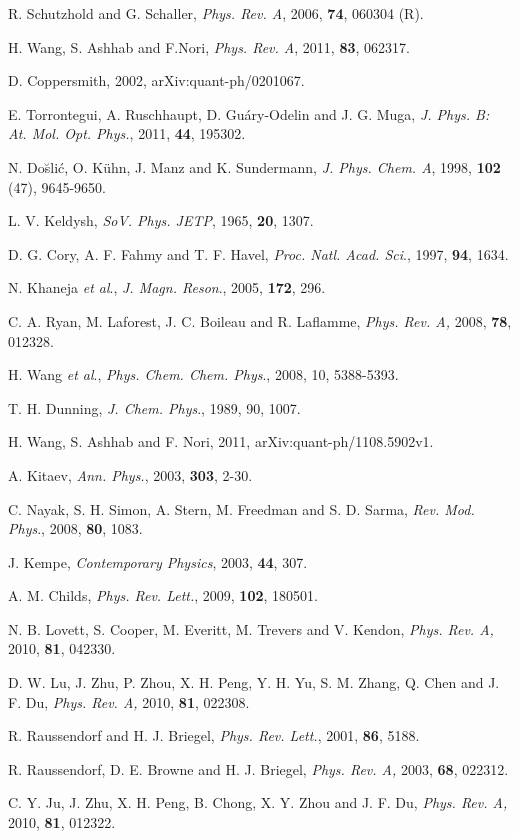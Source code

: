 \documentclass[8.5pt,twoside,twocolumn]{article}
\begin{document}
\begin{thebibliography}{99}
 R. Schutzhold and G. Schaller, \emph{Phys. Rev. A}, 2006, \textbf{74}, 060304
(R).

 H. Wang, S. Ashhab and F.Nori, \emph{Phys. Rev. A}, 2011, \textbf{83}, 062317.


D. Coppersmith, 2002, arXiv:quant-ph/0201067.

E. Torrontegui, A. Ruschhaupt, D. Gu\'{a}ry-Odelin and J. G. Muga, \emph{J. Phys. B: At. Mol. Opt. Phys.}, 2011, \textbf{44}, 195302.

N. Do\u{s}li\'{c}, O. K\"{u}hn, J. Manz and K. Sundermann, \emph{J. Phys. Chem. A}, 1998, \textbf{102} (47), 9645-9650.

L. V. Keldysh, \emph{SoV. Phys. JETP}, 1965, \textbf{20}, 1307.


D. G. Cory, A. F. Fahmy and T. F. Havel, \emph{Proc. Natl. Acad. Sci}., 1997, \textbf{94}, 1634.

N. Khaneja \emph{et al}., \emph{J. Magn. Reson}., 2005, \textbf{172}, 296.


C. A. Ryan, M. Laforest, J. C. Boileau and R. Laflamme, \emph{Phys. Rev. A,} 2008, \textbf{78}, 012328.

H. Wang \emph{et al}., \emph{Phys. Chem. Chem. Phys}., 2008, 10, 5388-5393.

 T. H. Dunning, \emph{J. Chem. Phys}., 1989, 90, 1007.

 H. Wang, S. Ashhab and F. Nori, 2011, arXiv:quant-ph/1108.5902v1.

A. Kitaev, \emph{Ann. Phys.}, 2003, \textbf{303}, 2-30.

C. Nayak, S. H. Simon, A. Stern, M. Freedman and S. D. Sarma, \emph{Rev. Mod. Phys}., 2008, \textbf{80}, 1083.

J. Kempe, \emph{Contemporary Physics}, 2003, \textbf{44}, 307.

 A. M. Childs, \emph{Phys. Rev. Lett.}, 2009, \textbf{102}, 180501.

N. B. Lovett, S. Cooper, M. Everitt, M. Trevers and V. Kendon, \emph{Phys. Rev. A,} 2010, \textbf{81}, 042330.

D. W. Lu, J. Zhu, P. Zhou, X. H. Peng, Y. H. Yu, S. M. Zhang, Q. Chen and J. F. Du, \emph{Phys. Rev. A,} 2010, \textbf{81}, 022308.

R. Raussendorf and H. J. Briegel, \emph{Phys. Rev. Lett.}, 2001, \textbf{86}, 5188.


R. Raussendorf, D. E. Browne and H. J. Briegel, \emph{Phys. Rev. A,} 2003, \textbf{68}, 022312.

 C. Y. Ju, J. Zhu, X. H. Peng, B. Chong, X. Y. Zhou and J. F. Du, \emph{Phys. Rev. A,} 2010, \textbf{81}, 012322.




\end{thebibliography}
\end{document}
